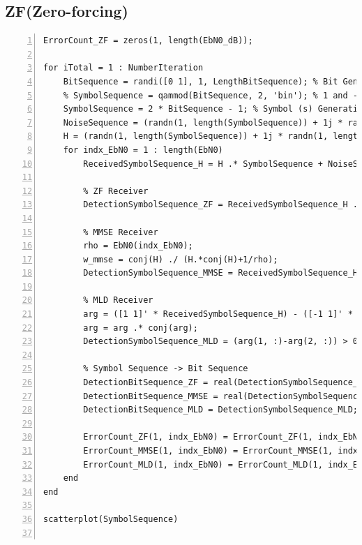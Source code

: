 \documentclass{article}
\begin{document}
\subsection{ZF(Zero-forcing)}
\begin{lstlisting}[style=Matlab-editor,
frame=single,
numbers=left,]
ErrorCount_ZF = zeros(1, length(EbN0_dB));

for iTotal = 1 : NumberIteration
    BitSequence = randi([0 1], 1, LengthBitSequence); % Bit Generation (BitSequence = rand(1, LengthBitSequence) > 0.5;)
    % SymbolSequence = qammod(BitSequence, 2, 'bin'); % 1 and -1    
    SymbolSequence = 2 * BitSequence - 1; % Symbol (s) Generation; consisting of 1 and -1
    NoiseSequence = (randn(1, length(SymbolSequence)) + 1j * randn(1, length(SymbolSequence))) ./ sqrt(2); % Noise (n) Generation
    H = (randn(1, length(SymbolSequence)) + 1j * randn(1, length(SymbolSequence))) ./ sqrt(2); % Channel (h) Generation
    for indx_EbN0 = 1 : length(EbN0)
        ReceivedSymbolSequence_H = H .* SymbolSequence + NoiseSequence * sqrt(1 / EbN0(indx_EbN0)); % Received Signal (y = hs + n) Generation
        
        % ZF Receiver
        DetectionSymbolSequence_ZF = ReceivedSymbolSequence_H ./ H; % Detection (Zero-Forcing: y / h)
        
        % MMSE Receiver
        rho = EbN0(indx_EbN0);
        w_mmse = conj(H) ./ (H.*conj(H)+1/rho);
        DetectionSymbolSequence_MMSE = ReceivedSymbolSequence_H .* w_mmse;
        
        % MLD Receiver
        arg = ([1 1]' * ReceivedSymbolSequence_H) - ([-1 1]' * H);
        arg = arg .* conj(arg);
        DetectionSymbolSequence_MLD = (arg(1, :)-arg(2, :)) > 0; % TODO: could possibly simplify it more
        
        % Symbol Sequence -> Bit Sequence
        DetectionBitSequence_ZF = real(DetectionSymbolSequence_ZF)>0;
        DetectionBitSequence_MMSE = real(DetectionSymbolSequence_MMSE)>0; % not sure if this is right
        DetectionBitSequence_MLD = DetectionSymbolSequence_MLD;
        
        ErrorCount_ZF(1, indx_EbN0) = ErrorCount_ZF(1, indx_EbN0) + biterr(DetectionBitSequence_ZF, BitSequence);
        ErrorCount_MMSE(1, indx_EbN0) = ErrorCount_MMSE(1, indx_EbN0) + biterr(DetectionBitSequence_MMSE, BitSequence);
        ErrorCount_MLD(1, indx_EbN0) = ErrorCount_MLD(1, indx_EbN0) + biterr(DetectionBitSequence_MLD, BitSequence);
    end
end

scatterplot(SymbolSequence)


\end{lstlisting}
\end{document}
